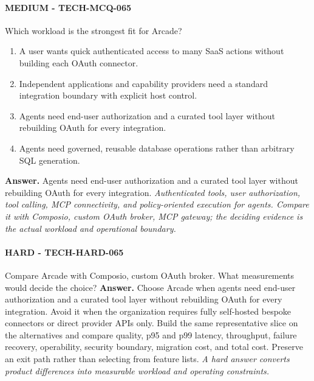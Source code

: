 \paragraph{MEDIUM - TECH-MCQ-065} Which workload is the strongest fit for Arcade?
\begin{enumerate}[label=\Alph*.]
\item A user wants quick authenticated access to many SaaS actions without building each OAuth connector.
\item Independent applications and capability providers need a standard integration boundary with explicit host control.
\item Agents need end-user authorization and a curated tool layer without rebuilding OAuth for every integration.
\item Agents need governed, reusable database operations rather than arbitrary SQL generation.
\end{enumerate}
\textbf{Answer.} Agents need end-user authorization and a curated tool layer without rebuilding OAuth for every integration.
\textit{Authenticated tools, user authorization, tool calling, MCP connectivity, and policy-oriented execution for agents. Compare it with Composio, custom OAuth broker, MCP gateway; the deciding evidence is the actual workload and operational boundary.}
\paragraph{HARD - TECH-HARD-065} Compare Arcade with Composio, custom OAuth broker. What measurements would decide the choice?
\textbf{Answer.} Choose Arcade when agents need end-user authorization and a curated tool layer without rebuilding OAuth for every integration. Avoid it when the organization requires fully self-hosted bespoke connectors or direct provider APIs only. Build the same representative slice on the alternatives and compare quality, p95 and p99 latency, throughput, failure recovery, operability, security boundary, migration cost, and total cost. Preserve an exit path rather than selecting from feature lists.
\textit{A hard answer converts product differences into measurable workload and operating constraints.}
